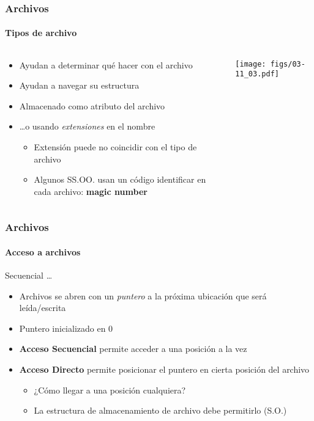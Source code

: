 \documentclass[letter]{beamer}
\begin{document}
\begin{frame}
  \frametitle{Archivos}
  \framesubtitle{Tipos de archivo}

  \begin{columns}[c]
    \begin{column}[T]{7cm}
      \begin{itemize}
        \item Ayudan a determinar qué hacer con el archivo
        \item Ayudan a navegar su estructura
        \item Almacenado como atributo del archivo
        \item \ldots o usando {\em extensiones} en el nombre
          \begin{itemize}
            \item Extensión puede no coincidir con el tipo de archivo
            \item Algunos SS.OO. usan un código identificar en cada archivo:
                {\bf magic number}
          \end{itemize}
      \end{itemize}
    \end{column}

    \begin{column}[T]{5cm}
      \begin{center}
        \texttt{[image: figs/03-11\_03.pdf]}
      \end{center}
    \end{column}
  \end{columns}
  
\end{frame}

\begin{frame}
  \frametitle{Archivos}
  \framesubtitle{Acceso a archivos}

  Secuencial \ldots {}
  
  \begin{itemize}
    \item Archivos se abren con un {\em puntero} a la próxima ubicación
          que será leída/escrita
    \item Puntero inicializado en $0$
    \item {\bf Acceso Secuencial} permite acceder a una posición a la vez
    \item {\bf Acceso Directo} permite posicionar el puntero en cierta posición del archivo
      \begin{itemize}
        \item ¿Cómo llegar a una posición cualquiera?
        \item La estructura de almacenamiento de archivo debe permitirlo (S.O.)
      \end{itemize}
  \end{itemize}

\end{frame}
\end{document}
